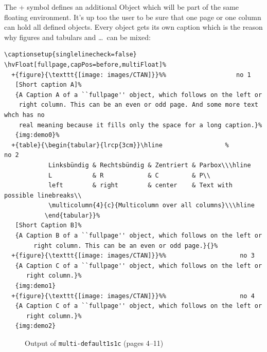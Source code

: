 \documentclass[twoside,paper=a4]{scrartcl}
\begin{document}
The + symbol defines an additional Object which will be part of the same floating environment.
It's up too the user to be sure that one page or one column can hold all defined objects.
Every object gets its own caption which is the reason why figures and tabulars and \ldots\ 
can be mixed:

\begin{lstlisting}
\captionsetup{singlelinecheck=false}
\hvFloat[fullpage,capPos=before,multiFloat]%
  +{figure}{\texttt{[image: images/CTAN]}}%%                   no 1
   [Short caption A]%
   {A Caption A of a ``fullpage'' object, which follows on the left or
    right column. This can be an even or odd page. And some more text whch has no
    real meaning because it fills only the space for a long caption.}%
   {img:demo0}%
  +{table}{\begin{tabular}{lrcp{3cm}}\hline                 %             no 2
            Linksbündig & Rechtsbündig & Zentriert & Parbox\\\hline
            L           & R            & C         & P\\
            left        & right        & center    & Text with possible linebreaks\\
            \multicolumn{4}{c}{Multicolumn over all columns}\\\hline
           \end{tabular}}%
   [Short Caption B]%
   {A Caption B of a ``fullpage'' object, which follows on the left or
        right column. This can be an even or odd page.}{}%
  +{figure}{\texttt{[image: images/CTAN]}}%%                    no 3
   {A Caption C of a ``fullpage'' object, which follows on the left or
      right column.}%
   {img:demo1}
  +{figure}{\texttt{[image: images/CTAN]}}%%                    no 4
   {A Caption C of a ``fullpage'' object, which follows on the left or
      right column.}%
   {img:demo2}
\end{lstlisting}


\begin{figure}[!h]
\hfill
{}\hfill
{}\hfill
{}

\hfill
{}\hfill
{}\hfill
\frame{\texttt{[image: examples/multi-default1s1c]}}
\caption{Output of \texttt{multi-default1s1c} (pages 4--11)}\label{multi-default1s1c}
\end{figure}
\end{document}
